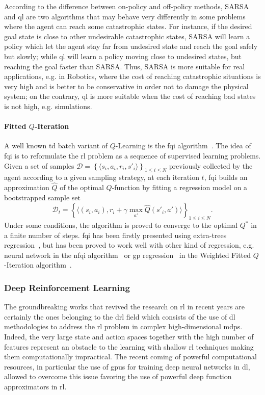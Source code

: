 According to the difference between on-policy and off-policy methods, SARSA and \gls{ql} are two algorithms that may behave very differently in some problems where the agent can reach some catastrophic states. For instance, if the desired goal state is close to other undesirable catastrophic states, SARSA will learn a policy which let the agent stay far from undesired state and reach the goal safely but slowly; while \gls{ql} will learn a policy moving close to undesired states, but reaching the goal faster than SARSA. Thus, SARSA is more suitable for real applications, e.g. in Robotics, where the cost of reaching catastrophic situations is very high and is better to be conservative in order not to damage the physical system; on the contrary, \gls{ql} is more suitable when the cost of reaching bad states is not high, e.g. simulations.

\paragraph{Fitted $Q$-Iteration}\label{S:FQI}
A well known \gls{td} batch variant of $Q$-Learning is the \gls{fqi} algorithm~\cite{ernst2005tree}. The idea of \gls{fqi} is to reformulate the \gls{rl} problem as a sequence of supervised learning problems. Given a set of samples $\mathcal{D} = \left\{\langle s_i, a_i, r_i, s'_i \rangle \right\}_{1\leq i\leq N}$ previously collected by the agent according to a given sampling strategy, at each iteration $t$, \gls{fqi} builds an approximation $\hat{Q}$ of the optimal $Q$-function by fitting a regression model on a bootstrapped sample set
\begin{equation}
 \mathcal{D}_t = \left\{ \langle (s_i,a_i), r_i + \gamma \max_{a'} \hat{Q}\left(s'_i, a'\right) \rangle\right\}_{1 \leq i \leq N}.
\end{equation}
Under some conditions, the algorithm is proved to converge to the optimal $Q^*$ in a finite number of steps. \gls{fqi} has been firstly presented using extra-trees regression~\cite{geurts2006extremely}, but has been proved to work well with other kind of regression, e.g. neural network in the \gls{nfqi} algorithm~\cite{riedmiller2005neural} or \gls{gp} regression~\cite{rasmussen2005gaussian} in the Weighted Fitted $Q$-Iteration algorithm~\cite{deramo2017maximum}.

\subsubsection{Deep Reinforcement Learning}
The groundbreaking works that revived the research on \gls{rl} in recent years are certainly the ones belonging to the \gls{drl} field which consists of the use of \gls{dl} methodologies to address the \gls{rl} problem in complex high-dimensional \glspl{mdp}. Indeed, the very large state and action spaces together with the high number of features represent an obstacle to the learning with shallow \gls{rl} techniques making them computationally impractical. The recent coming of powerful computational resources, in particular the use of \glspl{gpu} for training deep neural networks in \gls{dl}, allowed to overcome this issue favoring the use of powerful deep function approximators in \gls{rl}.

